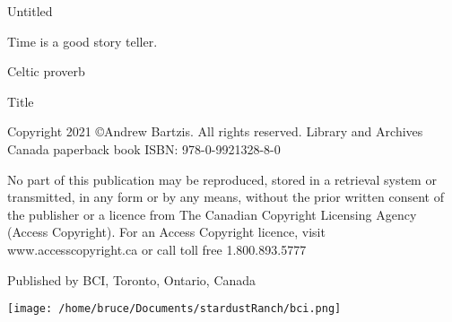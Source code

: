 \documentclass[letterpaper,9pt,twoside,titlepage,onecolumn,openany]{book}
\begin{document}
\newpage{}
\thispagestyle{empty}

\vspace{30mm}

\begin{center}
\huge{Untitled}\\
\large{}
\end{center}

\vspace{10mm}


\newpage




\begin{center}


\end{center}

\vspace{5mm}
\begin{center}

Time is a good story teller.


Celtic proverb

\end{center}

\newpage
\thispagestyle{empty}



\begin{center}



\large{Title}

\end{center}




\vspace{5mm}
\noindent
Copyright 2021  \copyright Andrew Bartzis. All rights reserved.
Library and Archives Canada paperback book ISBN: 978-0-9921328-8-0


\vspace{5mm}
\noindent
No part of this publication may be reproduced, stored in a retrieval system or transmitted, in any form or by any means, without the prior written consent of the publisher or a licence from The Canadian Copyright Licensing Agency (Access Copyright). For an Access Copyright licence, visit www.accesscopyright.ca or call toll free 1.800.893.5777


\vspace{5mm}
\noindent
Published by BCI, Toronto, Ontario, Canada


\begin{center}


\texttt{[image: /home/bruce/Documents/stardustRanch/bci.png]}

\end{center}
\end{document}
